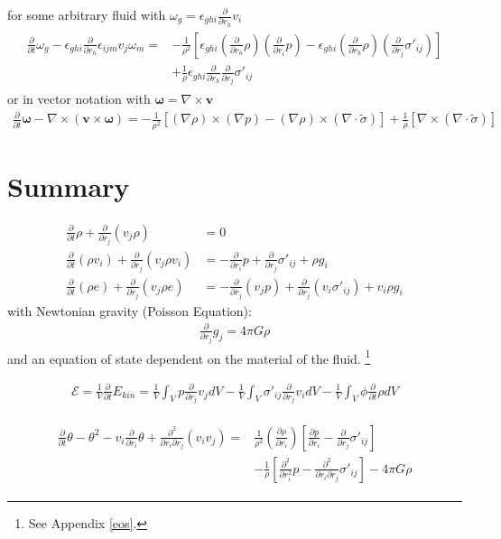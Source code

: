 \documentclass[a4paper,
					12pt,
					twoside,
					pagesize,
					cleardoubleplain,
					headsepline,
					bibtotoc
					]{scrbook}
\renewcommand{\vec}[1]{\boldsymbol{#1}}
\newcommand{\lra}[1]{{ \left( #1 \right) }}
\newcommand{\lrb}[1]{{ \left[ #1 \right] }}
\newcommand{\pd}[1]{\frac{\partial}{\partial #1}}
\newcommand{\ppd}[2]{\frac{\partial #2}{\partial #1}}
\newcommand{\pdd}[1]{\frac{\partial^2}{\partial #1^2}}
\begin{document}
for some arbitrary
fluid with $\omega_g=\epsilon_{ghi}\pd{r_h}v_i$
\begin{align}
\begin{split}
\pd{t}\omega_g
-\epsilon_{ghi}\pd{r_h} \epsilon_{ijm} v_j \omega_m =
&-\frac{1}{\rho^2}\lrb{
\epsilon_{ghi} \lra{\pd{r_h}\rho} \lra{\pd{r_i}p}
-\epsilon_{ghi} \lra{\pd{r_h}\rho} \lra{\pd{r_j}\sigma'_{ij}}}\\
&+\frac{1}{\rho}\epsilon_{ghi}\pd{r_h}\pd{r_j}\sigma'_{ij}
\end{split}
\end{align}
or in vector notation with $\vec{\omega}=\nabla \times \vec{v}$
\begin{align}
\pd{t} \vec{\omega}-\nabla \times (\vec{v} \times \vec{\omega}) = 
-\frac{1}{\rho^2}\lrb{(\nabla \rho) \times(\nabla p)
- (\nabla \rho) \times (\nabla \cdot \tilde{\sigma})}
+\frac{1}{\rho} \lrb{\nabla \times (\nabla \cdot \tilde{\sigma})}
\end{align}

\section{Summary}
\begin{align}
\pd{t}\rho + \pd{r_j}(v_j \rho) &= 0 \label{eq:mass}\\
\pd{t}(\rho v_i) + \pd{r_j}(v_j \rho v_i) &= -\pd{r_i}p + \pd{r_j}\sigma'_{ij}
+\rho g_i 
\label{eq:mom} \\
\pd{t}(\rho e) + \pd{r_j}(v_j \rho e) &= -\pd{r_j}(v_j p) + \pd{r_j}(v_i
\sigma'_{ij}) + v_i \rho g_i
\label{eq:etot}
\end{align}
with Newtonian gravity (Poisson Equation):
\begin{align}
\pd{r_j}g_j=4\pi G \rho
\end{align}
and an equation of state dependent on the material of the fluid.
\footnote{See Appendix \ref{eos}.}

\begin{align}
\mathcal{E} = \frac{1}{V} \pd{t} E_{kin} = 
\frac{1}{V} \int_V p \pd{r_j} v_j dV 
-\frac{1}{V} \int_V \sigma'_{ij}\pd{r_j} v_i dV
-\frac{1}{V} \int_V \phi \pd{t}\rho dV
\label{eq:diss}
\end{align}

\begin{align}
\begin{split}
\pd{t}\theta-\theta^2-v_i\pd{r_i}\theta
+\frac{\partial^2}{\partial r_i \partial r_j}(v_i v_j) =&
\frac{1}{\rho^2}\lra{\ppd{r_i}{\rho}}
\lrb{\ppd{r_i}{p}-\pd{r_j}\sigma'_{ij}}\\
&-\frac{1}{\rho}\lrb{\pdd{r_i}p
-\frac{\partial^2}{\partial r_i \partial r_j}\sigma'_{ij}}
-4\pi G \rho
\end{split}
\label{eq:div}
\end{align}
\end{document}
